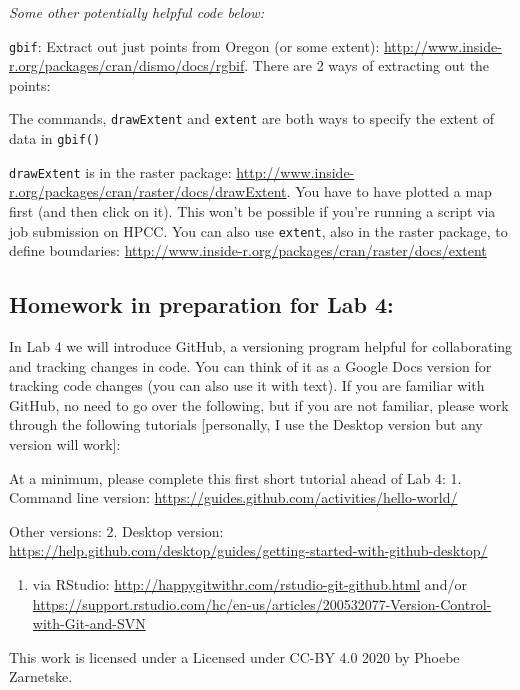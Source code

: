 \documentclass[
]{article}
\providecommand{\tightlist}{%
  \setlength{\itemsep}{0pt}\setlength{\parskip}{0pt}}
\begin{document}
\emph{Some other potentially helpful code below:}

\texttt{gbif}: Extract out just points from Oregon (or some extent):
\url{http://www.inside-r.org/packages/cran/dismo/docs/rgbif}. There are
2 ways of extracting out the points:

The commands, \texttt{drawExtent} and \texttt{extent} are both ways to
specify the extent of data in \texttt{gbif()}

\texttt{drawExtent} is in the raster package:
\url{http://www.inside-r.org/packages/cran/raster/docs/drawExtent}. You
have to have plotted a map first (and then click on it). This won't be
possible if you're running a script via job submission on HPCC. You can
also use \texttt{extent}, also in the raster package, to define
boundaries:
\url{http://www.inside-r.org/packages/cran/raster/docs/extent}

\hypertarget{homework-in-preparation-for-lab-4}{%
\subsection{Homework in preparation for Lab
4:}\label{homework-in-preparation-for-lab-4}}

In Lab 4 we will introduce GitHub, a versioning program helpful for
collaborating and tracking changes in code. You can think of it as a
Google Docs version for tracking code changes (you can also use it with
text). If you are familiar with GitHub, no need to go over the
following, but if you are not familiar, please work through the
following tutorials {[}personally, I use the Desktop version but any
version will work{]}:

At a minimum, please complete this first short tutorial ahead of Lab 4:
1. Command line version:
\url{https://guides.github.com/activities/hello-world/}

Other versions: 2. Desktop version:
\url{https://help.github.com/desktop/guides/getting-started-with-github-desktop/}

\begin{enumerate}
\def\labelenumi{\arabic{enumi}.}
\setcounter{enumi}{2}
\tightlist
\item
  via RStudio: \url{http://happygitwithr.com/rstudio-git-github.html}
  and/or
  \url{https://support.rstudio.com/hc/en-us/articles/200532077-Version-Control-with-Git-and-SVN}
\end{enumerate}

This work is licensed under a Licensed under CC-BY 4.0 2020 by Phoebe
Zarnetske.
\end{document}
